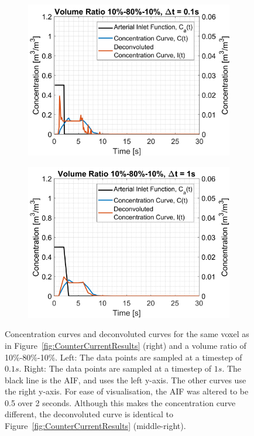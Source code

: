 \documentclass[11pt,english,a4paper,twoside,openright]{report}
\begin{document}
{{{{{{{\begin{figure}[h]
	\centering
	\begin{subfigure}[b]{0.49\textwidth}
		\includegraphics[width=\textwidth]{Chapter4/XRMonteCarlo108010_reducedtimescale2}
	\end{subfigure}
	\begin{subfigure}[b]{0.49\textwidth}
		\includegraphics[width=\textwidth]{Chapter4/XRMonteCarlo108010_reducedtimescale1}
	\end{subfigure}
	\caption[Concentration curves using the counter-current particle tracer method with the data sampling frequency length extended to $1s$]{Concentration curves and deconvoluted curves for the same voxel as in Figure~\ref{fig:CounterCurrentResults} (right) and a volume ratio of 10\%-80\%-10\%. Left: The data points are sampled at a timestep of $0.1s$. Right: The data points are sampled at a timestep of $1s$. The black line is the AIF, and uses the left y-axis. The other curves use the right y-axis. For ease of visualisation, the AIF was altered to be 0.5 over 2 seconds. Although this makes the concentration curve different, the deconvoluted curve is identical to Figure~\ref{fig:CounterCurrentResults} (middle-right). }
	\label{fig:CounterCurrentReducedTimescale}
\end{figure}

}}}}}}}
\end{document}
